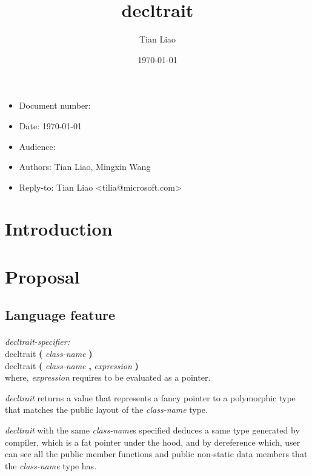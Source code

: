 \documentclass{article}
\title{decltrait}
\author{Tian Liao}
\date{\today}
\begin{document}
\maketitle
\vfill
\begin{itemize}[noitemsep]
  \item[] Document number:
  \item[] Date: \today
  \item[] Audience:
  \item[] Authors: Tian Liao, Mingxin Wang
  \item[] Reply-to: Tian Liao \textless tilia@microsoft.com\textgreater
\end{itemize}

\newpage
{}

\section{Introduction}

\section{Proposal}

\subsection{Language feature}
\paragraph{} \textit{decltrait-specifier:} \\
\indent decltrait \textbf{(} \textit{class-name} \textbf{)} \\
\indent decltrait \textbf{(} \textit{class-name} \textbf{,} \textit{expression} \textbf{)} \\
where, \textit{expression} requires to be evaluated as a pointer.

\textit{decltrait} returns a value that represents a fancy pointer to a polymorphic type that matches the public layout of the \textit{class-name} type.

\textit{decltrait} with the same \textit{class-name}s specified deduces a same type generated by compiler, which is a fat pointer under the hood, and by dereference which, user can see all the public member functions and public non-static data members that the \textit{class-name} type has.
\end{document}

